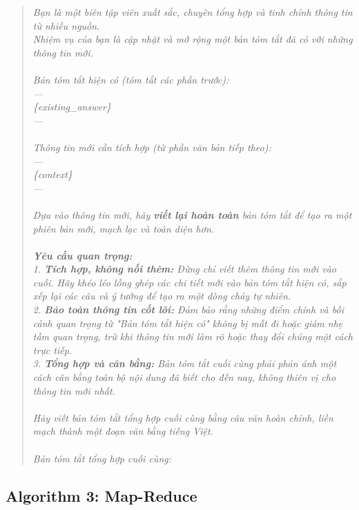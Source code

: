 \documentclass[11pt]{article}
\begin{document}
\begin{quote}
\textit{Bạn là một biên tập viên xuất sắc, chuyên tổng hợp và tinh chỉnh thông tin từ nhiều nguồn.\\
Nhiệm vụ của bạn là cập nhật và mở rộng một bản tóm tắt đã có với những thông tin mới.\\
\\
Bản tóm tắt hiện có (tóm tắt các phần trước):\\
---\\
\{existing\_answer\}\\
---\\
\\
Thông tin mới cần tích hợp (từ phần văn bản tiếp theo):\\
---\\
\{context\}\\
---\\
\\
Dựa vào thông tin mới, hãy \textbf{viết lại hoàn toàn} bản tóm tắt để tạo ra một phiên bản mới, mạch lạc và toàn diện hơn.\\
\\
\textbf{Yêu cầu quan trọng:}\\
1. \textbf{Tích hợp, không nối thêm:} Đừng chỉ viết thêm thông tin mới vào cuối. Hãy khéo léo lồng ghép các chi tiết mới vào bản tóm tắt hiện có, sắp xếp lại các câu và ý tưởng để tạo ra một dòng chảy tự nhiên.\\
2. \textbf{Bảo toàn thông tin cốt lõi:} Đảm bảo rằng những điểm chính và bối cảnh quan trọng từ "Bản tóm tắt hiện có" không bị mất đi hoặc giảm nhẹ tầm quan trọng, trừ khi thông tin mới làm rõ hoặc thay đổi chúng một cách trực tiếp.\\
3. \textbf{Tổng hợp và cân bằng:} Bản tóm tắt cuối cùng phải phản ánh một cách cân bằng toàn bộ nội dung đã biết cho đến nay, không thiên vị cho thông tin mới nhất.\\
\\
Hãy viết bản tóm tắt tổng hợp cuối cùng bằng câu văn hoàn chỉnh, liền mạch thành một đoạn văn bằng tiếng Việt.\\
\\
Bản tóm tắt tổng hợp cuối cùng:}
\end{quote}
\clearpage

\subsection{Algorithm 3: Map-Reduce}
\end{document}
